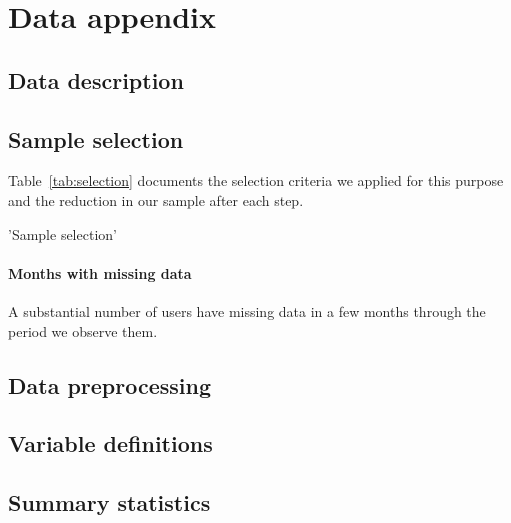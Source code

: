 
\section{Data appendix}
\label{sec:data_appendix}

\subsection{Data description}
\label{sub:data_description}


\subsection{Sample selection}
\label{sub:sample_selection}

Table~\ref{tab:selection} documents the selection criteria we applied for this purpose and the reduction in our sample after each step.

\begin{table}[h]
\caption{'Sample selection'}\label{tab:selection}

\end{table}


\paragraph{Months with missing data}
A substantial number of users have missing data in a few months through the period we observe them.

\subsection{Data preprocessing}
\label{sub:data_preprocessing}


\subsection{Variable definitions}
\label{sub:variable_definitions}


\subsection{Summary statistics}
\label{sub:summary_statistics}


